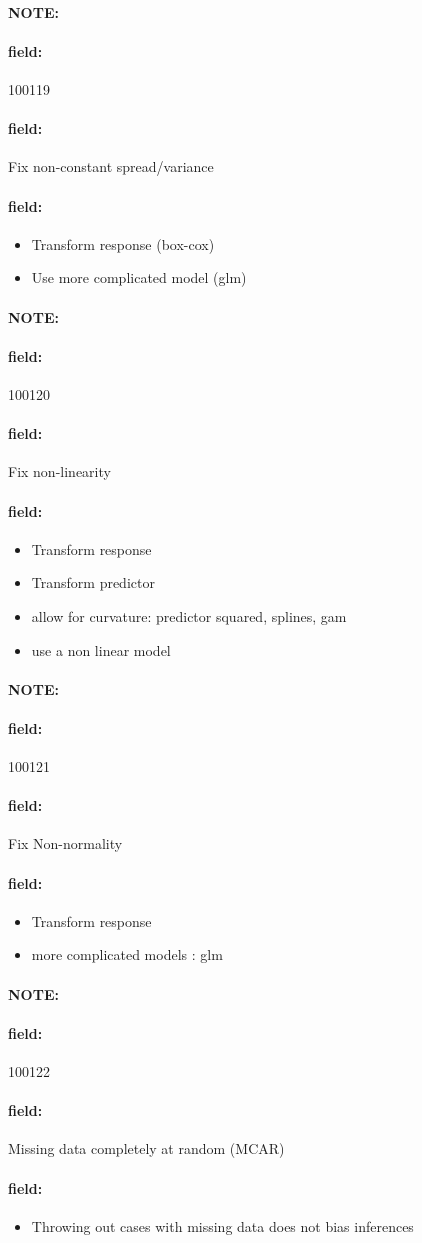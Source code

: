 \documentclass[12pt]{article}
\newenvironment{note}{\paragraph{NOTE:}}{}
\newenvironment{field}{\paragraph{field:}}{}
\begin{document}
\begin{note} \begin{field} \tiny 100119 \end{field}
  \begin{field}
    Fix non-constant spread/variance
  \end{field}
  \begin{field}
    \begin{itemize}
      \item Transform response (box-cox)
      \item Use more complicated model (glm)
    \end{itemize}
  \end{field}
\end{note}

\begin{note} \begin{field} \tiny 100120 \end{field}
  \begin{field}
    Fix non-linearity
  \end{field}
  \begin{field}
    \begin{itemize}
      \item Transform response
      \item Transform predictor
      \item allow for curvature: predictor squared, splines, gam
      \item use a non linear model
    \end{itemize}
  \end{field}
\end{note}

\begin{note} \begin{field} \tiny 100121 \end{field}
  \begin{field}
    Fix Non-normality
  \end{field}
  \begin{field}
    \begin{itemize}
      \item Transform response
      \item more complicated models : glm
    \end{itemize}
  \end{field}
\end{note}

\begin{note} \begin{field} \tiny 100122 \end{field}
  \begin{field}
    Missing data completely at random (MCAR)
  \end{field}
  \begin{field}
    \begin{itemize}
      \item Throwing out cases with missing data does not bias inferences
    \end{itemize}
  \end{field}
\end{note}
\end{document}
